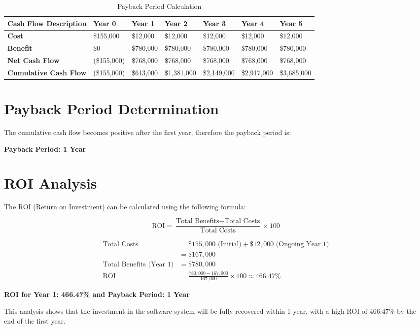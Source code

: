 \documentclass{scrreprt}
\begin{document}
\begin{table}[h!]
\centering
\begin{tabular}{|p{6cm}|p{2cm}|p{2cm}|p{2cm}|p{2cm}|p{2cm}|p{2cm}|}
\hline
\textbf{Cash Flow Description} & \textbf{Year 0} & \textbf{Year 1} & \textbf{Year 2} & \textbf{Year 3} & \textbf{Year 4} & \textbf{Year 5} \\
\hline
\textbf{Cost} & \$155{,}000 & \$12{,}000 & \$12{,}000 & \$12{,}000 & \$12{,}000 & \$12{,}000 \\
\hline
\textbf{Benefit} & \$0 & \$780{,}000 & \$780{,}000 & \$780{,}000 & \$780{,}000 & \$780{,}000 \\
\hline
\textbf{Net Cash Flow} & (\$155{,}000) & \$768{,}000 & \$768{,}000 & \$768{,}000 & \$768{,}000 & \$768{,}000 \\
\hline
\textbf{Cumulative Cash Flow} & (\$155{,}000) & \$613{,}000 & \$1{,}381{,}000 & \$2{,}149{,}000 & \$2{,}917{,}000 & \$3{,}685{,}000 \\
\hline
\end{tabular}
\caption{Payback Period Calculation}
\end{table}

\section*{Payback Period Determination}

The cumulative cash flow becomes positive after the first year, therefore the payback period is:

\textbf{Payback Period: 1 Year}

\section*{ROI Analysis}

The ROI (Return on Investment) can be calculated using the following formula:

\[
\text{ROI} = \frac{\text{Total Benefits} - \text{Total Costs}}{\text{Total Costs}} \times 100
\]

\begin{align*}
\text{Total Costs} &= \$155{,}000 \text{ (Initial)} + \$12{,}000 \text{ (Ongoing Year 1)} \\
&= \$167{,}000 \\
\text{Total Benefits (Year 1)} &= \$780{,}000 \\
\text{ROI} &= \frac{780{,}000 - 167{,}000}{167{,}000} \times 100 \approx 466.47\%
\end{align*}

\textbf{ROI for Year 1: 466.47\% and Payback Period: 1 Year}
\newline

This analysis shows that the investment in the software system will be fully recovered within 1 year, with a high ROI of 466.47\% by the end of the first year.
\end{document}
